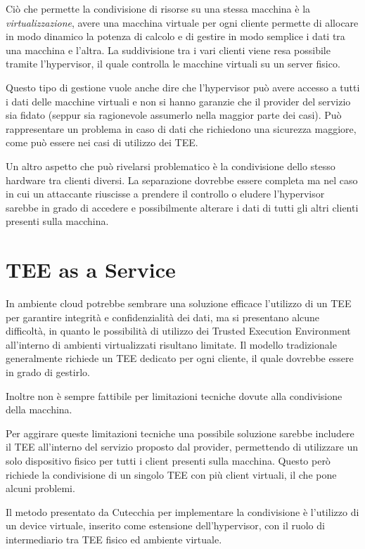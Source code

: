 \documentclass[12pt,italian]{report}
\begin{document}
	Ciò che permette la condivisione di risorse su una stessa macchina è la \textit{virtualizzazione}, avere una macchina virtuale per ogni cliente permette di allocare in modo dinamico la potenza di calcolo e di gestire in modo semplice i dati tra una macchina e l'altra. La suddivisione tra i vari clienti viene resa possibile tramite l'hypervisor, il quale controlla le macchine virtuali su un server fisico.
	
	Questo tipo di gestione vuole anche dire che l'hypervisor può avere accesso a tutti i dati delle macchine virtuali e non si hanno garanzie che il provider del servizio sia fidato (seppur sia ragionevole assumerlo nella maggior parte dei casi). Può rappresentare un problema in caso di dati che richiedono una sicurezza maggiore, come può essere nei casi di utilizzo dei TEE.
	
	Un altro aspetto che può rivelarsi problematico è la condivisione dello stesso hardware tra clienti diversi. La separazione dovrebbe essere completa ma nel caso in cui un attaccante riuscisse a prendere il controllo o eludere l'hypervisor sarebbe in grado di accedere e possibilmente alterare i dati di tutti gli altri clienti presenti sulla macchina.
	
	\section{TEE as a Service}
	\label{sec:taas}
	In ambiente cloud potrebbe sembrare una soluzione efficace l'utilizzo di un TEE per garantire integrità e confidenzialità dei dati, ma si presentano alcune difficoltà, in quanto le possibilità di utilizzo dei Trusted Execution Environment all'interno di ambienti virtualizzati risultano limitate. Il modello tradizionale generalmente richiede un TEE dedicato per ogni cliente, il quale dovrebbe essere in grado di gestirlo.
	
	Inoltre non è sempre fattibile per limitazioni tecniche dovute alla condivisione della macchina.
	
	\bigbreak
	
	Per aggirare queste limitazioni tecniche una possibile soluzione sarebbe includere il TEE all'interno del servizio proposto dal provider, permettendo di utilizzare un solo dispositivo fisico per tutti i client presenti sulla macchina. Questo però richiede la condivisione di un singolo TEE con più client virtuali, il che pone alcuni problemi.
	
	Il metodo presentato da Cutecchia \cite{tesi_cutecchia} per implementare la condivisione è l'utilizzo di un device virtuale, inserito come estensione dell'hypervisor, con il ruolo di intermediario tra TEE fisico ed ambiente virtuale. 
	
\end{document}
